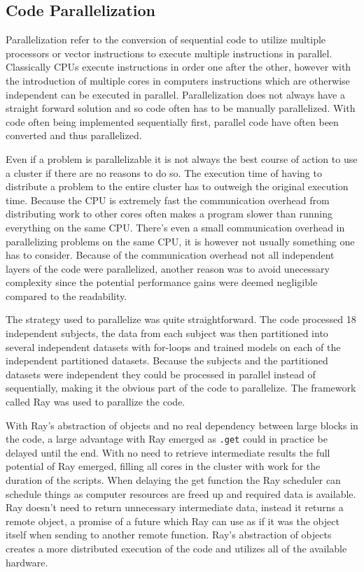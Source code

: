 \documentclass[12pt, a4paper]{article}
\begin{document}
\subsection{Code Parallelization}
Parallelization refer to the conversion of sequential code to utilize multiple processors or vector instructions to execute multiple instructions in parallel.
Classically CPUs execute instructions in order one after the other, however with the introduction of multiple cores in computers instructions which are otherwise independent can be executed in parallel.
Parallelization does not always have a straight forward solution and so code often has to be manually parallelized.
With code often being implemented sequentially first, parallel code have often been converted and thus parallelized.

Even if a problem is parallelizable it is not always the best course of action to use a cluster if there are no reasons to do so.
The execution time of having to distribute a problem to the entire cluster has to outweigh the original execution time.
Because the CPU is extremely fast the communication overhead from distributing work to other cores often makes a program slower than running everything on the same CPU.
There's even a small communication overhead in parallelizing problems on the same CPU, it is however not usually something one has to consider.
Because of the communication overhead not all independent layers of the code were parallelized, another reason was to avoid unecessary complexity since the potential performance gains were deemed negligible compared to the readability.

The strategy used to parallelize was quite straightforward. 
The code processed 18 independent subjects, the data from each subject was then partitioned into several independent datasets with for-loops and trained models on each of the independent partitioned datasets. 
Because the subjects and the partitioned datasets were independent they could be processed in parallel instead of sequentially, making it the obvious part of the code to parallelize.
The framework called Ray was used to parallize the code. 

With Ray's abstraction of objects and no real dependency between large blocks in the code, a large advantage with Ray emerged as \texttt{.get} could in practice be delayed until the end.
With no need to retrieve intermediate results the full potential of Ray emerged, filling all cores in the cluster with work for the duration of the scripts.
When delaying the get function the Ray scheduler can schedule things as computer resources are freed up and required data is available.
Ray doesn't need to return unnecessary intermediate data, instead it returns a remote object, a promise of a future which Ray can use as if it was the object itself when sending to another remote function.
Ray's abstraction of objects creates a more distributed execution of the code and utilizes all of the available hardware.
\end{document}
